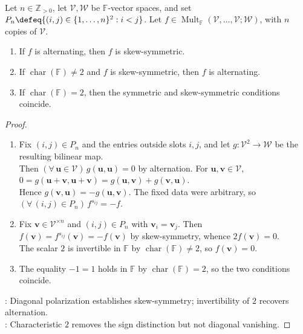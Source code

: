 \begin{proposition} \label{prop:alternating-skew-characteristic} \\
Let $n\in\mathbb{Z}_{>0}$, let $\mathcal{V},\mathcal{W}$ be $\mathbb{F}$-vector spaces, and set $P_n\defeq\{(i,j)\in\{1,\ldots,n\}^2:i<j\}$. Let $f\in\operatorname{Mult}_{\mathbb{F}}(\mathcal{V},\ldots,\mathcal{V};\mathcal{W})$, with $n$ copies of $\mathcal{V}$.
\begin{enumerate}[label=(\roman*)]
\setlength{\itemsep}{0pt}
\item If $f$ is alternating, then $f$ is skew-symmetric.
\item If $\operatorname{char}(\mathbb{F})\neq2$ and $f$ is skew-symmetric, then $f$ is alternating.
\item If $\operatorname{char}(\mathbb{F})=2$, then the symmetric and skew-symmetric conditions coincide.
\end{enumerate}
\begin{proof}
\begin{enumerate}[label=(\roman*)]
\setlength{\itemsep}{0pt}
\item Fix $(i,j)\in P_n$ and the entries outside slots $i,j$, and let $g:\mathcal{V}^2\to\mathcal{W}$ be the resulting bilinear map.\\
Then $(\forall\,\mathbf{u}\in\mathcal{V})\,g(\mathbf{u},\mathbf{u})=0$ by alternation. For $\mathbf{u},\mathbf{v}\in\mathcal{V}$, $0=g(\mathbf{u}+\mathbf{v},\mathbf{u}+\mathbf{v})=g(\mathbf{u},\mathbf{v})+g(\mathbf{v},\mathbf{u})$.\\
Hence $g(\mathbf{v},\mathbf{u})=-g(\mathbf{u},\mathbf{v})$. The fixed data were arbitrary, so $(\forall\,(i,j)\in P_n)\,f^{s_{ij}}=-f$.
\item Fix $\mathbf{v}\in\mathcal{V}^{\times n}$ and $(i,j)\in P_n$ with $\mathbf{v}_i=\mathbf{v}_j$. Then $f(\mathbf{v})=f^{s_{ij}}(\mathbf{v})=-f(\mathbf{v})$ by skew-symmetry, whence $2f(\mathbf{v})=0$.\\
The scalar $2$ is invertible in $\mathbb{F}$ by $\operatorname{char}(\mathbb{F})\neq2$, so $f(\mathbf{v})=0$.
\item The equality $-1=1$ holds in $\mathbb{F}$ by $\operatorname{char}(\mathbb{F})=2$, so the two conditions coincide.
\end{enumerate}
: Diagonal polarization establishes skew-symmetry; invertibility of $2$ recovers alternation.\\
: Characteristic $2$ removes the sign distinction but not diagonal vanishing.
\end{proof}
\end{proposition}

